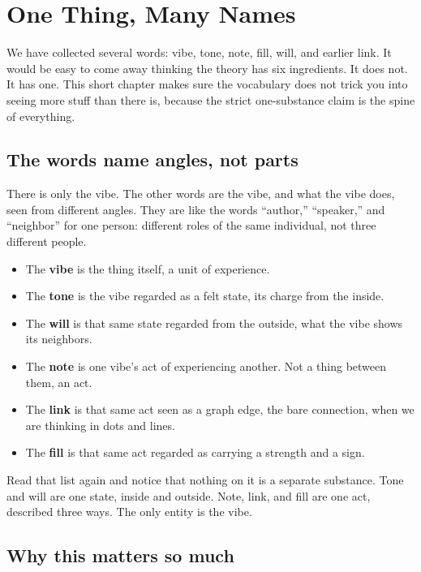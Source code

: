 \section{One Thing, Many Names}

We have collected several words: vibe, tone, note, fill, will, and earlier link. It would be easy to come away thinking the theory has six ingredients. It does not. It has one. This short chapter makes sure the vocabulary does not trick you into seeing more stuff than there is, because the strict one-substance claim is the spine of everything.

\subsection{The words name angles, not parts}

There is only the vibe. The other words are the vibe, and what the vibe does, seen from different angles. They are like the words ``author,'' ``speaker,'' and ``neighbor'' for one person: different roles of the same individual, not three different people.

\begin{itemize}
\item The \textbf{vibe} is the thing itself, a unit of experience.
\item The \textbf{tone} is the vibe regarded as a felt state, its charge from the inside.
\item The \textbf{will} is that same state regarded from the outside, what the vibe shows its neighbors.
\item The \textbf{note} is one vibe's act of experiencing another. Not a thing between them, an act.
\item The \textbf{link} is that same act seen as a graph edge, the bare connection, when we are thinking in dots and lines.
\item The \textbf{fill} is that same act regarded as carrying a strength and a sign.
\end{itemize}

Read that list again and notice that nothing on it is a separate substance. Tone and will are one state, inside and outside. Note, link, and fill are one act, described three ways. The only entity is the vibe.

\subsection{Why this matters so much}

